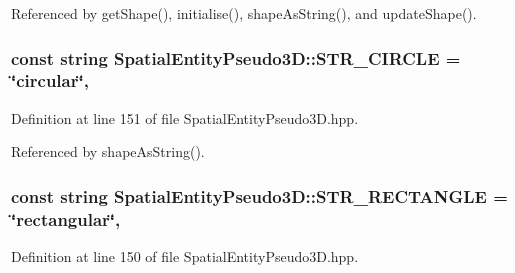 Referenced by get\-Shape(), initialise(), shape\-As\-String(), and update\-Shape().

\hypertarget{classmultiscale_1_1analysis_1_1SpatialEntityPseudo3D_a561e862c97a4717eb5b4977c55d05d90}{
\subsubsection[{S\-T\-R\-\_\-\-C\-I\-R\-C\-L\-E}]{\setlength{\rightskip}{0pt plus 5cm}const string Spatial\-Entity\-Pseudo3\-D\-::\-S\-T\-R\-\_\-\-C\-I\-R\-C\-L\-E = \char`\"{}circular\char`\"{}\hspace{0.3cm}{\ttfamily [static]}, {\ttfamily [protected]}}}\label{classmultiscale_1_1analysis_1_1SpatialEntityPseudo3D_a561e862c97a4717eb5b4977c55d05d90}


Definition at line 151 of file Spatial\-Entity\-Pseudo3\-D.\-hpp.



Referenced by shape\-As\-String().

\hypertarget{classmultiscale_1_1analysis_1_1SpatialEntityPseudo3D_a9b80a7c37a8c82fed02a1e23b1173843}{
\subsubsection[{S\-T\-R\-\_\-\-R\-E\-C\-T\-A\-N\-G\-L\-E}]{\setlength{\rightskip}{0pt plus 5cm}const string Spatial\-Entity\-Pseudo3\-D\-::\-S\-T\-R\-\_\-\-R\-E\-C\-T\-A\-N\-G\-L\-E = \char`\"{}rectangular\char`\"{}\hspace{0.3cm}{\ttfamily [static]}, {\ttfamily [protected]}}}\label{classmultiscale_1_1analysis_1_1SpatialEntityPseudo3D_a9b80a7c37a8c82fed02a1e23b1173843}


Definition at line 150 of file Spatial\-Entity\-Pseudo3\-D.\-hpp.



